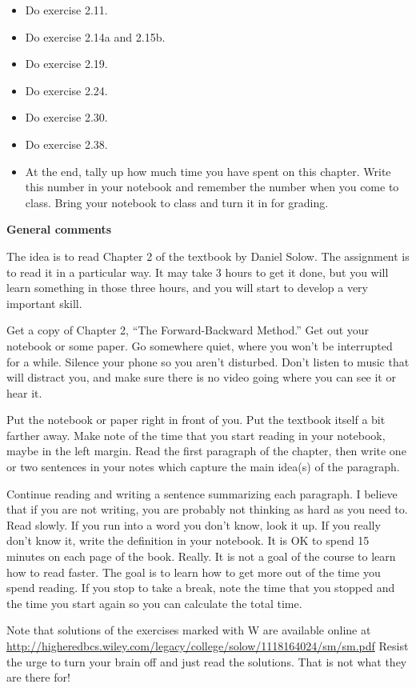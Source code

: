 \begin{itemize}
\item Do exercise 2.11.

\item Do exercise 2.14a and 2.15b.

\item Do exercise 2.19.

\item Do exercise 2.24.

\item Do exercise 2.30.

\item Do exercise 2.38.

\item At the end, tally up how much time you have spent on this chapter.
Write this number in your notebook and remember the number when you come to class.
Bring your notebook to class and turn it in for grading.
\end{itemize}

\noindent
{\bf General comments}

The idea is to read Chapter 2 of the textbook by Daniel Solow.
The assignment is to read it in a particular way.
It may take 3 hours to get it done, but you will learn something in those three hours, and you will start to develop a very important skill.

Get a copy of Chapter 2, ``The Forward-Backward Method.''
Get out your notebook or some paper.
Go somewhere quiet, where you won't be interrupted for a while.
Silence your phone so you aren't disturbed.
Don't listen to music that will distract you, and make sure there is no video going where you can see it or hear it.

Put the notebook or paper right in front of you.
Put the textbook itself a bit farther away.
Make note of the time that you start reading in your notebook, maybe in the left margin.
Read the first paragraph of the chapter, then write one or two sentences in your notes which capture the main idea(s) of the paragraph.

Continue reading and writing a sentence summarizing each paragraph.
I believe that if you are not writing, you are probably not thinking as hard as you need to.
Read slowly.
If you run into a word you don't know, look it up.  
If you really don't know it, write the definition in your notebook.
It is OK to spend 15 minutes on each page of the book.  Really.
It is not a goal of the course to learn how to read faster.
The goal is to learn how to get more out of the time you spend reading.
If you stop to take a break, note the time that you stopped and the time you start again so you can calculate the total time.

Note that solutions of the exercises marked with W are available online at 
\url{http://higheredbcs.wiley.com/legacy/college/solow/1118164024/sm/sm.pdf}
Resist the urge to turn your brain off and just read the solutions.  That is not what they are there for!

